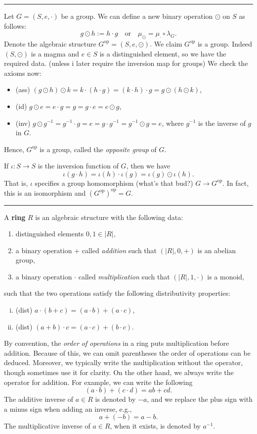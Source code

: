\documentclass[12pt]{article}
\newcommand{\keyword}[1]{\textbf{#1}}
\newcommand{\sepline}{\rule{\textwidth}{0.4pt}}
\theoremstyle{definition}
\newcommand{\isp}[1]{\quad\text{#1}\quad}
\newcommand{\<}{\left\langle}
\renewcommand{\>}{\right\rangle}
\newcommand{\op}{\mathrm{op}}
\begin{document}
\sepline

Let $G = (S, e, \cdot)$ be a group.
We can define a new binary operation $\odot$ on $S$ as follows:
\[
    g \odot h := h \cdot g \isp{or} \mu_\odot = \mu_\cdot \circ \lambda_G.
\]
Denote the algebraic structure $G^\op = (S, e, \odot)$.
We claim $G^\op$ is a group.
Indeed $(S, \odot)$ is a magma and $e \in S$ is a distinguished element, so we have the required data. (unless i later require the inversion map for groups)
We check the axioms now:
\begin{itemize}[nosep]
    \item (ass) $(g \odot h) \odot k = k \cdot (h \cdot g) = (k \cdot h) \cdot g = g \odot (h \odot k)$,
    \item (id) $g \odot e = e \cdot g = g = g \cdot e = e \odot g$,
    \item (inv) $g \odot g^{-1} = g^{-1} \cdot g = e = g \cdot g^{-1} = g^{-1} \odot g = e$, where $g^{-1}$ is the inverse of $g$ in $G$. 
\end{itemize}
Hence, $G^\op$ is a group, called the \emph{opposite group} of $G$.

If $\iota : S \to S$ is the inversion function of $G$, then we have
\[
    \iota(g \cdot h) = \iota(h) \cdot \iota(g) = \iota(g) \odot \iota(h).
\]
That is, $\iota$ specifies a group homomorphism (what's that bud?) $G \to G^\op$.
In fact, this is an isomorphism and $(G^\op)^\op = G$.


\newpage
\sepline

A \keyword{ring} $R$ is an algebraic structure with the following data:
\begin{enumerate}[(1)]
    \item distinguished elements $0, 1 \in |R|$,
    \item a binary operation $+$ called \emph{addition} such that $(|R|, 0, +)$ is an abelian group,
    \item a binary operation $\cdot$ called \emph{multiplication} such that $(|R|, 1, \cdot)$ is a monoid,
\end{enumerate}
such that the two operations satisfy the following distributivity properties:
\begin{enumerate}[(i)]
    \item (dist) $a \cdot (b + c) = (a \cdot b) + (a \cdot c)$,
    \item (dist) $(a + b) \cdot c = (a \cdot c) + (b \cdot c)$.
\end{enumerate}

By convention, the \emph{order of operations} in a ring puts multiplication before addition.
Because of this, we can omit parentheses the order of operations can be deduced.
Moreover, we typically write the multiplication without the operator, though sometimes use it for clarity.
On the other hand, we always write the operator for addition.
For example, we can write the following
\[
    (a \cdot b) + (c \cdot d) = ab + cd.
\]
The additive inverse of $a \in R$ is denoted by $-a$, and we replace the plus sign with a minus sign when adding an inverse, e.g.,
\[
    a + (-b) = a - b.
\]
The multiplicative inverse of $a \in R$, when it exists, is denoted by $a^{-1}$.
\end{document}
